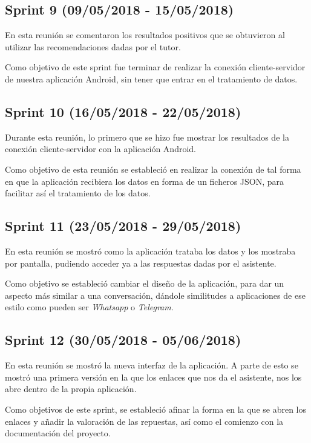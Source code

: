 \subsection{Sprint 9 (09/05/2018 - 15/05/2018)}

En esta reunión se comentaron los resultados positivos que se obtuvieron al utilizar las recomendaciones dadas por el tutor.

Como objetivo de este sprint fue terminar de realizar la conexión cliente-servidor de nuestra aplicación Android, sin tener que entrar en el tratamiento de datos.

\subsection{Sprint 10 (16/05/2018 - 22/05/2018)}

Durante esta reunión, lo primero que se hizo fue mostrar los resultados de la conexión cliente-servidor con la aplicación Android.

Como objetivo de esta reunión se estableció en realizar la conexión de tal forma en que la aplicación recibiera los datos en forma de un ficheros JSON, para facilitar así el tratamiento de los datos.

\subsection{Sprint 11 (23/05/2018 - 29/05/2018)}

En esta reunión se mostró como la aplicación trataba los datos y los mostraba por pantalla, pudiendo acceder ya a las respuestas dadas por el asistente.

Como objetivo se estableció cambiar el diseño de la aplicación, para dar un aspecto más similar a una conversación, dándole similitudes a aplicaciones de ese estilo como pueden ser \textit{Whatsapp} o \textit{Telegram}.

\subsection{Sprint 12 (30/05/2018 - 05/06/2018)}

En esta reunión se mostró la nueva interfaz de la aplicación. A parte de esto se mostró una primera versión en la que los enlaces que nos da el asistente, nos los abre dentro de la propia aplicación.

Como objetivos de este sprint, se estableció afinar la forma en la que se abren los enlaces y añadir la valoración de las repuestas, así como el comienzo con la documentación del proyecto.



